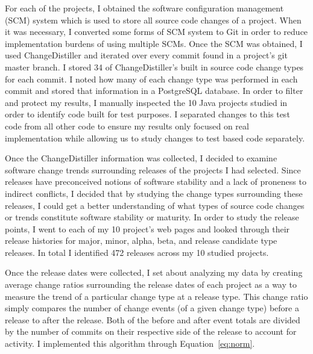 For each of the projects, I obtained the software configuration management (SCM) system
which is used to store all source code changes of a project. When it was necessary, I converted some forms of SCM system to Git in order to reduce implementation
burdens of using multiple SCMs. Once the SCM was obtained, I used ChangeDistiller and iterated over every commit found in a project's git master branch. I stored
34 of ChangeDistiller's built in source code change types for each commit. I noted how many of each change type was performed in each commit and stored that information
in a PostgreSQL database. In order to filter and protect my results, I manually inspected the 10 Java projects studied in order to identify code built for test
purposes.
I separated changes to this test code from all other code to ensure my results only focused on real implementation while allowing us to study changes to
test based code separately.

Once the ChangeDistiller information was collected, I decided to examine software change trends surrounding releases of the projects I had selected. Since releases
have preconceived notions of software stability and a lack of proneness to indirect conflicts, 
I decided that by studying the change types surrounding these releases, I could get a better understanding of
what types of source code changes or trends constitute software stability or maturity. In order to study the release points, I went to each of my 10 project's 
web pages and looked through their release histories for major, minor, alpha, beta, and release candidate type releases. In total I identified 472 releases
across my 10 studied projects.  

Once the release dates were collected, I set about analyzing my data by creating average change ratios surrounding the release dates of each 
project as a way to measure the trend of a particular change type at a release type. This change ratio simply compares the number of change events (of a given
change type) before a release to after the release. Both of the before and after event totals are divided by the number of commits on their respective side
of the release to account for activity. I implemented this algorithm through Equation~\ref{eq:norm}.

